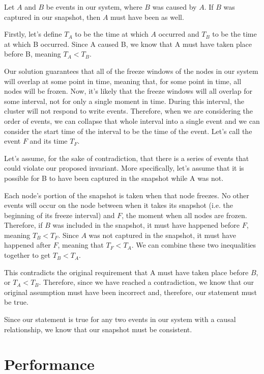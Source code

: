 Let $A$ and $B$ be events in our system, where $B$ was caused by
$A$. If $B$ was captured in our snapshot, then $A$ must have been as
well.

Firstly, let’s define $T_A$ to be the time at which $A$ occurred and
$T_B$ to be the time at which B occurred. Since A caused B, we know
that A must have taken place before B, meaning $T_A< T_B$.

Our solution guarantees that all of the freeze windows of the nodes in
our system will overlap at some point in time, meaning that, for some
point in time, all nodes will be frozen. Now, it’s likely that the
freeze windows will all overlap for some interval, not for only a
single moment in time. During this interval, the cluster will not
respond to write events. Therefore, when we are considering the order
of events, we can collapse that whole interval into a single event and
we can consider the start time of the interval to be the time of the
event. Let’s call the event $F$ and its time $T_F$.

Let’s assume, for the sake of contradiction, that there is a series of
events that could violate our proposed invariant. More specifically,
let’s assume that it is possible for B to have been captured in the
snapshot while A was not.

Each node’s portion of the snapshot is taken when that node
freezes. No other events will occur on the node between when it takes
its snapshot (i.e. the beginning of its freeze interval) and $F$, the
moment when all nodes are frozen. Therefore, if $B$ was included in
the snapshot, it must have happened before $F$, meaning $T_B <
T_F$. Since $A$ was not captured in the snapshot, it must have
happened after $F$, meaning that $T_F<T_A$. We can combine these two
inequalities together to get $T_B< T_A$.

This contradicts the original requirement that A must have taken place
before $B$, or $T_A< T_B$. Therefore, since we have reached a
contradiction, we know that our original assumption must have been
incorrect and, therefore, our statement must be true.

Since our statement is true for any two events in our system with a
causal relationship, we know that our snapshot must be consistent.

\section{Performance}

